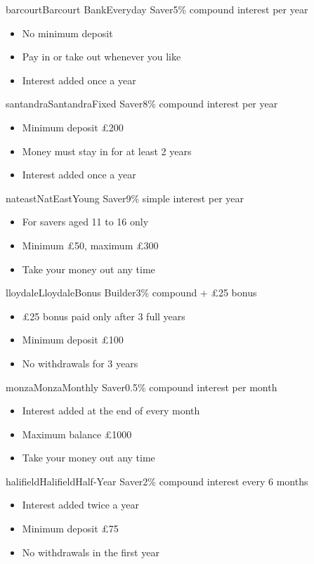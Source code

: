\documentclass[12pt]{article}
\newcommand{\deal}[1]{%
  \begin{itemize}[leftmargin=4mm,itemsep=1.6mm,topsep=0mm,parsep=0mm,label=\textbullet]
  #1
  \end{itemize}}
\begin{document}
\begin{tcbraster}[raster columns=2, raster equal height=rows,
                  raster column skip=5mm, raster row skip=5mm]
\begin{advert}{barcourt}{Barcourt Bank}{Everyday Saver}{5\% compound interest per year}
\deal{
  \item No minimum deposit
  \item Pay in or take out whenever you like
  \item Interest added once a year
}
\end{advert}
\begin{advert}{santandra}{Santandra}{Fixed Saver}{8\% compound interest per year}
\deal{
  \item Minimum deposit \pounds200
  \item Money must stay in for at least 2 years
  \item Interest added once a year
}
\end{advert}
\begin{advert}{nateast}{NatEast}{Young Saver}{9\% simple interest per year}
\deal{
  \item For savers aged 11 to 16 only
  \item Minimum \pounds50, maximum \pounds300
  \item Take your money out any time
}
\end{advert}
\begin{advert}{lloydale}{Lloydale}{Bonus Builder}{3\% compound + \pounds25 bonus}
\deal{
  \item \pounds25 bonus paid only after 3 full years
  \item Minimum deposit \pounds100
  \item No withdrawals for 3 years
}
\end{advert}
\begin{advert}{monza}{Monza}{Monthly Saver}{0.5\% compound interest per month}
\deal{
  \item Interest added at the end of every month
  \item Maximum balance \pounds1000
  \item Take your money out any time
}
\end{advert}
\begin{advert}{halifield}{Halifield}{Half-Year Saver}{2\% compound interest every 6 months}
\deal{
  \item Interest added twice a year
  \item Minimum deposit \pounds75
  \item No withdrawals in the first year
}
\end{advert}
\end{tcbraster}
\end{document}
